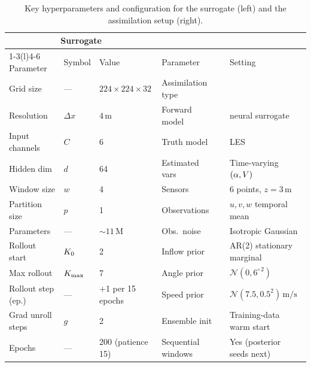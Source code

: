 \begin{table}[t]
  \centering
  \caption{Key hyperparameters and configuration for the \pthreed{} surrogate (left)
           and the \esmda{} assimilation setup (right).}
  \label{tab:hparams}
  \renewcommand{\arraystretch}{1.15}
  \footnotesize
  \begin{tabular}{lll@{\hspace{1em}}lll}
    \toprule
    \multicolumn{3}{c}{\textbf{Surrogate}} &
    \multicolumn{3}{c}{\textbf{\esmda{}}} \\
    \cmidrule(r){1-3}\cmidrule(l){4-6}
    Parameter & Symbol & Value &
    Parameter & & Setting \\
    \midrule
    Grid size          & ---          & $224\times224\times32$    &
      Assimilation type  & & \esmda{} \\
    Resolution         & $\Delta x$   & $4\,\mathrm{m}$           &
      Forward model      & & \pthreed{} neural surrogate \\
    Input channels     & $C$          & 6                         &
      Truth model        & & \palm{} LES \\
    Hidden dim         & $d$          & 64                        &
      Estimated vars     & & Time-varying $(\alpha,V)$ \\
    Window size        & $w$          & 4                         &
      Sensors            & & 6 points, $z=3\,\mathrm{m}$ \\
    Partition size     & $p$          & 1                         &
      Observations       & & $u, v, w$ temporal mean \\
    Parameters         & ---          & ${\sim}11\,\mathrm{M}$    &
      Obs.\ noise        & & Isotropic Gaussian \\
    Rollout start      & $K_0$     & 2                         &
      Inflow prior       & & AR(2) stationary marginal \\
    Max rollout        & $K_{\max}$      & 7                         &
      Angle prior        & & $\mathcal{N}(0,6^{\circ\,2})$ \\
    Rollout step (ep.) & ---          & +1 per 15 epochs          &
      Speed prior        & & $\mathcal{N}(7.5, 0.5^2)\,\mathrm{m/s}$ \\
    Grad unroll steps  & $g$          & 2                         &
      Ensemble init      & & Training-data warm start \\
    Epochs             & ---          & 200 (patience 15)         &
      Sequential windows & & Yes (posterior seeds next) \\

\end{tabular}
\end{table}
